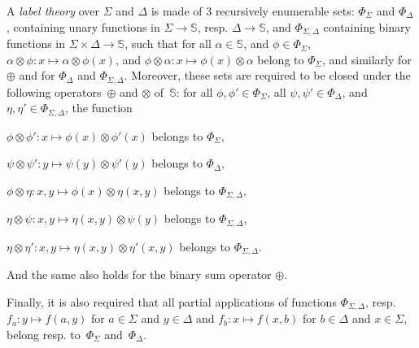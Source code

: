 \documentclass[runningheads]{llncs}
\newcommand{\Semiring}{\mathbb{S}}
\begin{document}
\noindent 
A \emph{label theory} over $\Sigma$ and $\Delta$
is made of 3 recursively enumerable sets:
$\Phi_\Sigma$ and $\Phi_\Delta$, 
containing unary functions in $\Sigma \to \Semiring$, resp. $\Delta \to \Semiring$, 
and $\Phi_{\Sigma, \Delta}$  containing binary functions in $\Sigma \times \Delta \to \Semiring$, 
such that 
for all $\alpha \in \Semiring$, and $\phi \in \Phi_\Sigma$,
$\alpha \otimes \phi : x \mapsto \alpha \otimes \phi(x)$, 
and $\phi \otimes \alpha : x \mapsto \phi(x) \otimes \alpha$
belong to $\Phi_\Sigma$, and similarly for $\oplus$ 
and for $\Phi_\Delta$ and $\Phi_{\Sigma, \Delta}$.
%
Moreover, these sets are required to be closed under the following 
operators~$\oplus$ and $\otimes$ of~$\Semiring$:
for all $\phi, \phi' \in \Phi_\Sigma$,
all $\psi, \psi' \in \Phi_\Delta$, 
and $\eta, \eta' \in \Phi_{\Sigma, \Delta}$, the function
\begin{description}
\item $\phi \otimes \phi' : x \mapsto \phi(x) \otimes \phi'(x)$ belongs to $\Phi_\Sigma$, 
\item $\psi \otimes \psi' : y \mapsto \psi(y) \otimes \psi'(y)$ belongs to $\Phi_\Delta$,
\item $\phi \otimes \eta : x, y \mapsto \phi(x) \otimes \eta(x, y)$ belongs to $\Phi_{\Sigma, \Delta}$,
\item $\eta \otimes \psi : x, y \mapsto \eta(x, y) \otimes \psi(y)$ belongs to $\Phi_{\Sigma, \Delta}$,
\item $\eta \otimes \eta' : x, y \mapsto \eta(x, y) \otimes \eta'(x, y)$ belongs to $\Phi_{\Sigma, \Delta}$.
\end{description}
And the same also holds for the binary sum operator $\oplus$.

\noindent
Finally, it is also required 
that all partial applications of functions $\Phi_{\Sigma, \Delta}$, 
resp.  $f_a: y \mapsto f(a, y)$ for $a \in \Sigma$ and $y \in \Delta$
and  $f_b: x \mapsto f(x, b)$ for $b \in \Delta$ and $x \in \Sigma$, 
belong resp. to~$\Phi_\Sigma$ and~$\Phi_\Delta$.
\end{document}
